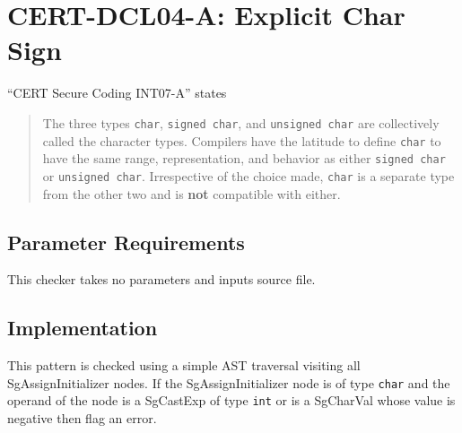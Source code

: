 %
%

\section{CERT-DCL04-A: Explicit Char Sign}
\label{ExplicitCharSign::overview}
``CERT Secure Coding INT07-A'' states
\begin{quote}
The three types {\tt char}, {\tt signed char}, and {\tt unsigned char} are collectively called the character types. Compilers have the latitude to define {\tt char} to have the same range, representation, and behavior as either {\tt signed char} or {\tt unsigned char}. Irrespective of the choice made, {\tt char} is a separate type from the other two and is {\bf not} compatible with either.
\end{quote}

\subsection{Parameter Requirements}
This checker takes no parameters and inputs source file.

\subsection{Implementation}
This pattern is checked using a simple AST traversal visiting all SgAssignInitializer nodes. If the SgAssignInitializer node is of type {\tt char} and the operand of the node is a SgCastExp of type {\tt int} or is a SgCharVal whose value is negative then flag an error.

